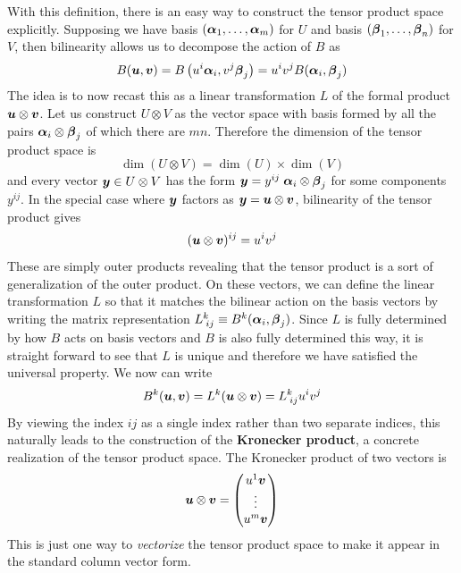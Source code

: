 \documentclass[onecolumn]{gwclass}
\begin{document}
	With this definition, there is an easy way to construct the tensor product space explicitly. Supposing we have basis $(\boldsymbol{\alpha}_1,\dots,\boldsymbol{\alpha}_m)$ for $U$ and basis $(\boldsymbol{\beta}_1,\dots,\boldsymbol{\beta}_n)$ for $V$, then bilinearity allows us to decompose the action of $B$ as
	$$ B(\boldsymbol{u},\boldsymbol{v})=B\left( u^i\boldsymbol{\alpha}_i,  v^j\boldsymbol{\beta}_j\right) =  u^i v^j B(\boldsymbol{\alpha}_i, \boldsymbol{\beta}_j) $$
	The idea is to now recast this as a linear transformation $L$ of the formal product $\boldsymbol{u}\otimes\boldsymbol{v}$. Let us construct $U\otimes V$ as the vector space with basis formed by all the pairs $\boldsymbol{\alpha}_i\otimes\boldsymbol{\beta}_j$ of which there are $m n$. Therefore the dimension of the tensor product space is 
	$$\dim(U\otimes V) = \dim(U)\times \dim(V)$$ 
	and every vector $\boldsymbol{y}\in U\otimes V$ has the form $ \boldsymbol{y} = y^{ij}\;\boldsymbol{\alpha}_i\otimes\boldsymbol{\beta}_j $ for some components $y^{ij}$. In the special case where $\boldsymbol{y}$ factors as $\boldsymbol{y}=\boldsymbol{u}\otimes\boldsymbol{v}$, bilinearity of the tensor product gives
	$$ (\boldsymbol{u}\otimes\boldsymbol{v})^{ij} = u^iv^j $$
	These are simply outer products revealing that the tensor product is a sort of generalization of the outer product. On these vectors, we can define the linear transformation $L$ so that it matches the bilinear action on the basis vectors by writing the matrix representation $L^k_{\;ij} \equiv B^k(\boldsymbol{\alpha}_i,\boldsymbol{\beta}_j)$. Since $L$ is fully determined by how $B$ acts on basis vectors and $B$ is also fully determined this way, it is straight forward to see that $L$ is unique and therefore we have satisfied the universal property. We now can write
	$$ B^k(\boldsymbol{u},\boldsymbol{v}) = L^k(\boldsymbol{u}\otimes\boldsymbol{v}) =   L^k_{\;ij} u^iv^j $$
	By viewing the index $ij$ as a single index rather than two separate indices, this naturally leads to the construction of the \textbf{Kronecker product}, a concrete realization of the tensor product space. The Kronecker product of two vectors is
	$$ \boldsymbol{u}\otimes\boldsymbol{v} = \begin{pmatrix}
		u^1\boldsymbol{v} \\
		\vdots \\
		u^m\boldsymbol{v}
	\end{pmatrix} $$
	This is just one way to \emph{vectorize} the tensor product space to make it appear in the standard column vector form. 
	
\end{document}

